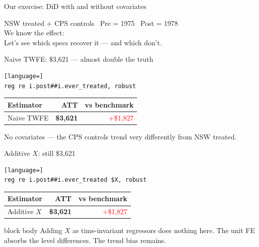 \documentclass[aspectratio=169,11pt]{beamer}
\newcommand{\emphbox}[1]{%
  \begin{beamercolorbox}[rounded=true,sep=7pt,wd=\linewidth]{block body}%
    \small\color{slate} #1%
  \end{beamercolorbox}}
\begin{document}
\begin{frame}{Our exercise: DiD with and without covariates}
\vspace{0.8em}
\begin{center}
NSW treated $+$ CPS controls \textperiodcentered\
Pre = 1975 \textperiodcentered\ Post = 1978\\[0.6em]
\large We know the effect: \\[0.6em]
\normalsize\color{warmgray}
Let's see which specs recover it --- and which don't.
\end{center}
\end{frame}

\begin{frame}[fragile]{Naive TWFE: \$3,621 --- almost double the truth}
\vspace{0.4em}
\begin{lstlisting}[language=]
reg re i.post##i.ever_treated, robust
\end{lstlisting}
\vspace{0.5em}
\begin{center}
\begin{tabular}{lrr}
\toprule
Estimator & ATT & vs benchmark \\
\midrule
Naive TWFE & \textbf{\$3,621} & \textcolor{red}{$+$\$1,827} \\
\bottomrule
\end{tabular}
\end{center}
\vspace{0.4em}
\begin{center}\color{warmgray}\small
No covariates --- the CPS controls trend very differently from NSW treated.
\end{center}
\end{frame}

\begin{frame}[fragile]{Additive $X$: still \$3,621}
\vspace{0.4em}
\begin{lstlisting}[language=]
reg re i.post##i.ever_treated $X, robust
\end{lstlisting}
\vspace{0.5em}
\begin{center}
\begin{tabular}{lrr}
\toprule
Estimator & ATT & vs benchmark \\
\midrule
Additive $X$ & \textbf{\$3,621} & \textcolor{red}{$+$\$1,827} \\
\bottomrule
\end{tabular}
\end{center}
\vspace{0.4em}
\emphbox{Adding $X$ as time-invariant regressors does nothing here. The unit FE absorbs the level differences. The trend bias remains.}
\end{frame}
\end{document}
